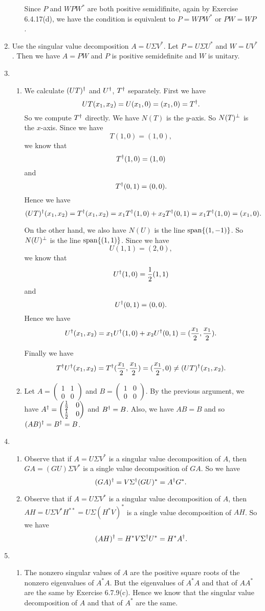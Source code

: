 \begin{enumerate}
\begin{enumerate}
Since $P$ and $WPW^*$ are both positive semidifinite, again by Exercise 6.4.17(d), we have the condition is equivalent to $P=WPW^*$ or $PW=WP$.
\end{enumerate}
\item Use the singular value decomposition $A=U\Sigma V^*$. Let $P=U\Sigma U^*$ and $W=UV^*$. Then we have $A=PW$ and $P$ is positive semidefinite and $W$ is unitary.
\item \begin{enumerate}
\item We calculate $(UT)\da $ and $U\da $, $T\da$ separately. First we have 
\[UT(x_1,x_2)=U(x_1,0)=(x_1,0)=T\da.\]
So we compute $T\da$ directly. We have $N(T)$ is the $y$-axis. So $N(T)\pp$ is the $x$-axis. Since we have 
\[T(1,0)=(1,0),\]
we know that 
\[T\da(1,0)=(1,0)\] 
and 
\[T\da(0,1)=(0,0).\]
Hence we have 
\[(UT)\da(x_1,x_2)=T\da(x_1,x_2)=x_1T\da(1,0)+x_2T\da(0,1)=x_1T\da(1,0)=(x_1,0).\]

On the other hand, we also have $N(U)$ is the line $\sp\{(1,-1)\}$. So $N(U)\pp$ is the line $\sp\{(1,1)\}$. Since we have 
\[U(1,1)=(2,0),\]
we know that 
\[U\da(1,0)=\frac{1}{2}(1,1)\]
and 
\[U\da(0,1)=(0,0).\]
Hence we have 
\[U\da(x_1,x_2)=x_1U\da(1,0)+x_2U\da(0,1)=(\frac{x_1}{2},\frac{x_1}{2}).\]

Finally we have 
\[T\da U\da(x_1,x_2)=T\da(\frac{x_1}{2},\frac{x_1}{2})=(\frac{x_1}{2},0)\neq (UT)\da(x_1,x_2).\]
\item Let $A=\begin{pmatrix}1&1\\0&0\end{pmatrix}$ and $B=\begin{pmatrix}1&0\\0&0\end{pmatrix}$. By the previous argument, we have $A\da=\begin{pmatrix}\frac{1}{2}&0\\\frac{1}{2}&0\end{pmatrix}$ and $B\da =B$. Also, we have $AB=B$ and so $(AB)\da=B\da=B$.
\end{enumerate}
\item \begin{enumerate}
\item Observe that if $A=U\Sigma V^*$ is a singular value decomposition of $A$, then $GA=(GU)\Sigma V^*$ is a single value decomposition of $GA$. So we have 
\[(GA)\da =V\Sigma \da (GU)^*=A\da G^*.\]
\item Observe that if $A=U\Sigma V^*$ is a singular value decomposition of $A$, then $AH=U\Sigma V^*H^{**}=U\Sigma (H^*V)^*$ is a single value decomposition of $AH$. So we have 
\[(AH)\da =H^*V\Sigma \da U^*=H^*A\da.\]
\end{enumerate}
\item \begin{enumerate}
\item The nonzero singular values of $A$ are the positive square roots of the nonzero eigenvalues of $A^*A$. But the eigenvalues of $A^*A$ and that of $AA^*$ are the same by Exercise 6.7.9(c). Hence we know that the singular value decomposition of $A$ and that of $A^*$ are the same. 


\end{enumerate}
\end{enumerate}
